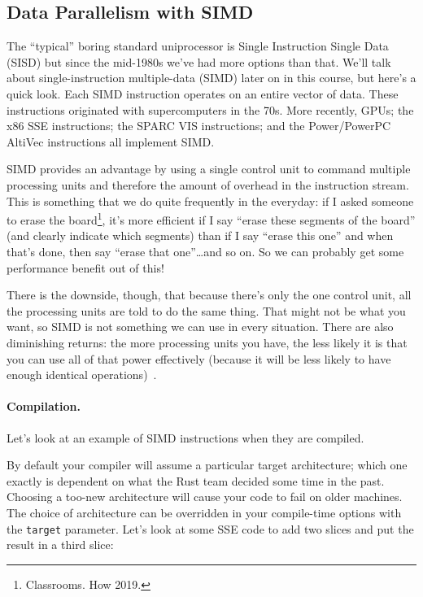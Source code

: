 \documentclass[a4paper]{report}
\begin{document}
\subsection*{Data Parallelism with SIMD}
The ``typical'' boring standard uniprocessor is Single Instruction Single Data (SISD) but since the mid-1980s we've had more options than that. We'll talk about single-instruction multiple-data (SIMD) later on in
this course, but here's a quick look. Each SIMD
instruction operates on an entire vector of data. These instructions
originated with supercomputers in the 70s. More recently, GPUs; the
x86 SSE instructions; the SPARC VIS instructions; and the
Power/PowerPC AltiVec instructions all implement SIMD.

SIMD provides an advantage by using a single control unit to command multiple processing units and therefore the amount of overhead in the instruction stream. This is something that we do quite frequently in the everyday: if I asked someone to erase the board\footnote{Classrooms. How 2019.}, it's more efficient if I say ``erase these segments of the board'' (and clearly indicate which segments) than if I say ``erase this one'' and when that's done, then say ``erase that one''\ldots and so on. So we can probably get some performance benefit out of this!

There is the downside, though, that because there's only the one control unit, all the processing units are told to do the same thing. That might not be what you want, so SIMD is not something we can use in every situation. There are also diminishing returns: the more processing units you have, the less likely it is that you can use all of that power effectively (because it will be less likely to have enough identical operations)~\cite{sse}.

\paragraph{Compilation.} Let's look at an example of SIMD instructions when they are compiled.

By default your compiler will assume a particular target architecture; which one exactly is dependent on what the Rust team decided some time in the past. Choosing a too-new architecture will cause your code to fail on older machines. The choice of architecture can be overridden in your compile-time options with the \texttt{target} parameter. Let's look at some SSE code to add two slices and put the result in a third slice:
\end{document}
